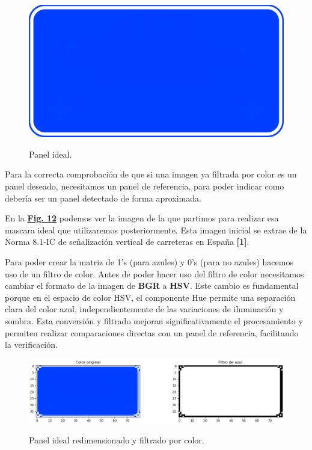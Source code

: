 \documentclass[a4paper, 12pt]{article}
\begin{document}
\begin{figure}[h]
	\centering
	\caption{Panel ideal.}\vspace{0.5cm}
	\includegraphics[width=0.4\linewidth]{img/ideal_mask}
	\label{fig:idealmask}
\end{figure}

Para la correcta comprobación de que si una imagen ya filtrada por color es un panel deseado, necesitamos un panel de referencia, para poder indicar como debería ser un panel detectado de forma aproximada.


En la  \textbf{\hyperref[fig:idealmask]{Fig. 12}} podemos ver la imagen de la que partimos para realizar esa mascara ideal que utilizaremos posteriormente. Esta imagen inicial se extrae de la Norma 8.1-IC de señalización vertical de carreteras en España \textbf{[1]}.

Para poder crear la matriz de 1's (para azules) y 0's (para no azules) hacemos uso de un filtro de color. Antes de poder hacer uso del filtro de color necesitamos cambiar el formato de la imagen de \textbf{BGR} a \textbf{HSV}. Este cambio es fundamental porque en el espacio de color HSV, el componente Hue permite una separación clara del color azul, independientemente de las variaciones de iluminación y sombra. Esta conversión y filtrado mejoran significativamente el procesamiento y permiten realizar comparaciones directas con un panel de referencia, facilitando la verificación.

\begin{figure}[h]
	\centering
	\caption{Panel ideal redimensionado y filtrado por color.}\vspace{0.5cm}
	\includegraphics[width=0.9\linewidth]{img/ideal_mask_resized_and_filtered}
	\label{fig:idealmaskresizedandfiltered}
\end{figure}
\end{document}
